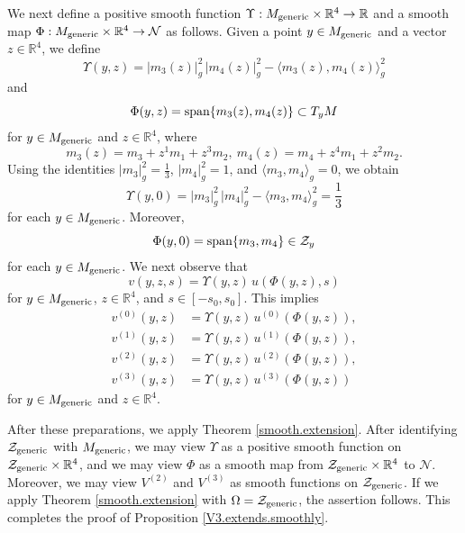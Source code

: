 \documentclass[11pt]{amsart}
\theoremstyle{definition}
\begin{document}
We next define a positive smooth function $\Upsilon: M_{\text{\rm generic}} \times \mathbb{R}^4 \to \mathbb{R}$ and a smooth map $\Phi: M_{\text{\rm generic}} \times \mathbb{R}^4 \to \mathcal{N}$ as follows. Given a point $y \in M_{\text{\rm generic}}$ and a vector $z \in \mathbb{R}^4$, we define 
\begin{equation} 
\label{definition.of.Upsilon}
\Upsilon(y,z) = |m_3(z)|_g^2 \, |m_4(z)|_g^2 - \langle m_3(z),m_4(z) \rangle_g^2 
\end{equation}
and 
\begin{equation} 
\label{definition.of.Phi}
\Phi(y,z) = \text{\rm span}\{m_3(z),m_4(z)\} \subset T_y M 
\end{equation}
for $y \in M_{\text{\rm generic}}$ and $z \in \mathbb{R}^4$, where 
\[ m_3(z)=m_3+z^1 m_1+z^3 m_2,\ m_4(z)=m_4+z^4 m_1+z^2 m_2. \] 
Using the identities $|m_3|_g^2 = \frac{1}{3}$, $|m_4|_g^2 = 1$, and $\langle m_3,m_4 \rangle_g = 0$, we obtain 
\[\Upsilon(y,0) = |m_3|_g^2 \, |m_4|_g^2 - \langle m_3,m_4 \rangle_g^2 = \frac{1}{3}\]
for each $y \in M_{\text{\rm generic}}$. Moreover, 
\[\Phi(y,0) = \text{\rm span}\{m_3,m_4\} \in \mathcal{Z}_y\] 
for each $y \in M_{\text{\rm generic}}$. We next observe that 
\[v(y,z,s) = \Upsilon(y,z) \, u(\Phi(y,z),s)\]
for $y \in M_{\text{\rm generic}}$, $z \in \mathbb{R}^4$, and $s \in [-s_0,s_0]$. This implies 
\begin{align*}
v^{(0)}(y,z) &= \Upsilon(y,z) \, u^{(0)}(\Phi(y,z)), \\ 
v^{(1)}(y,z) &= \Upsilon(y,z) \, u^{(1)}(\Phi(y,z)), \\ 
v^{(2)}(y,z) &= \Upsilon(y,z) \, u^{(2)}(\Phi(y,z)), \\ 
v^{(3)}(y,z) &= \Upsilon(y,z) \, u^{(3)}(\Phi(y,z)) 
\end{align*}
for $y \in M_{\text{\rm generic}}$ and $z \in \mathbb{R}^4$. 

After these preparations, we apply Theorem \ref{smooth.extension}. After identifying $\mathcal{Z}_{\rm generic}$ with $M_{\text{\rm generic}}$, we may view $\Upsilon$ as a positive smooth function on $\mathcal{Z}_{\text{\rm generic}} \times \mathbb{R}^4$, and we may view $\Phi$ as a smooth map from $\mathcal{Z}_{\text{\rm generic}} \times \mathbb{R}^4$ to $\mathcal{N}$. Moreover, we may view $V^{(2)}$ and $V^{(3)}$ as smooth functions on $\mathcal{Z}_{\text{\rm generic}}$. If we apply Theorem \ref{smooth.extension} with $\Omega = \mathcal{Z}_{\text{\rm generic}}$, the assertion follows. This completes the proof of Proposition \ref{V3.extends.smoothly}. \\
\end{document}
